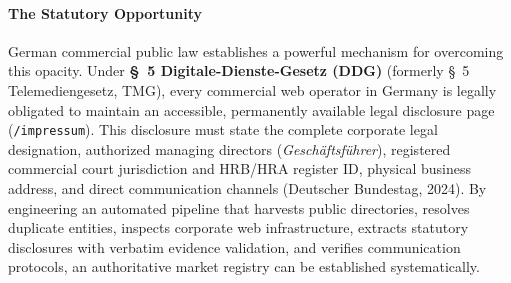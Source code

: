 \documentclass[11pt,a4paper]{article}
\begin{document}
\paragraph{The Statutory Opportunity} German commercial public law establishes a powerful mechanism for overcoming this opacity. Under \textbf{\S~5 Digitale-Dienste-Gesetz (DDG)} (formerly \S~5 Telemediengesetz, TMG), every commercial web operator in Germany is legally obligated to maintain an accessible, permanently available legal disclosure page (\texttt{/impressum}). This disclosure must state the complete corporate legal designation, authorized managing directors (\textit{Gesch\"aftsf\"uhrer}), registered commercial court jurisdiction and HRB/HRA register ID, physical business address, and direct communication channels (Deutscher Bundestag, 2024). By engineering an automated pipeline that harvests public directories, resolves duplicate entities, inspects corporate web infrastructure, extracts statutory disclosures with verbatim evidence validation, and verifies communication protocols, an authoritative market registry can be established systematically.
\end{document}
